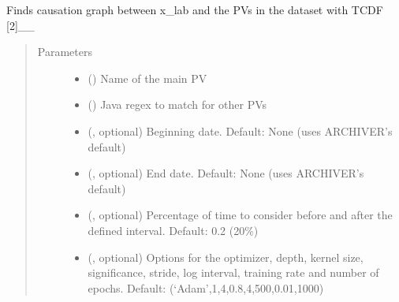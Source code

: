 \documentclass[letterpaper,10pt,english]{sphinxmanual}
\begin{document}
\begin{fulllineitems}
\begin{fulllineitems}
\label{\detokenize{dataset:dataset.Dataset.causation_EPICS}}
\sphinxAtStartPar
Finds causation graph between x\_lab and the PVs in the dataset with TCDF {[}2{]}\_\_
\begin{quote}\begin{description}
\item[{Parameters}] \leavevmode\begin{itemize}
\item {} 
\sphinxAtStartPar
{} () \textendash{} Name of the main PV

\item {} 
\sphinxAtStartPar
{} () \textendash{} Java regex to match for other PVs

\item {} 
\sphinxAtStartPar
{} (, optional) \textendash{} Beginning date. Default: None (uses ARCHIVER’s default)

\item {} 
\sphinxAtStartPar
{} (, optional) \textendash{} End date. Default: None (uses ARCHIVER’s default)

\item {} 
\sphinxAtStartPar
{} (, optional) \textendash{} Percentage of time to consider before and after the defined interval. Default: 0.2 (20\%)

\item {} 
\sphinxAtStartPar
{} (, optional) \textendash{} Options for the optimizer, depth, kernel size, significance, stride, log interval, training rate and number of epochs. Default: (‘Adam’,1,4,0.8,4,500,0.01,1000)

\end{itemize}


\end{description}
\end{quote}
\end{fulllineitems}
\end{fulllineitems}
\end{document}
